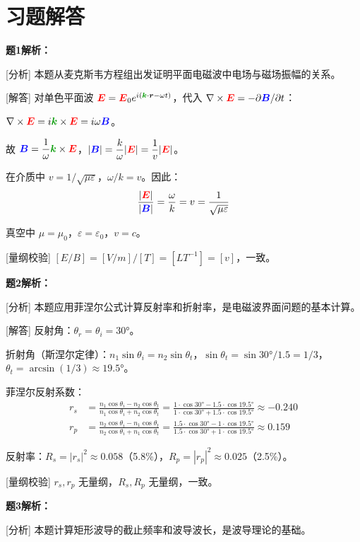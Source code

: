 \documentclass[11pt,a4paper,openany,oneside]{book}
\newcommand{\vecE}{\textcolor{red}{\vect{E}}}
\newcommand{\vecB}{\textcolor{blue}{\vect{B}}}
\newcommand{\vecK}{\textcolor{green!60!black}{\vect{k}}}
\newcommand{\eps}{\varepsilon}
\newcommand{\vect}[1]{\bm{#1}}
\newcommand{\curl}{\nabla\times}
\begin{document}
\section*{习题解答}

\textbf{题1解析：}

[分析] 本题从麦克斯韦方程组出发证明平面电磁波中电场与磁场振幅的关系。

[解答] 对单色平面波 $\vecE = \vecE_0 e^{i(\vecK\cdot\vect{r} - \omega t)}$，代入 $\curl\vecE = -\partial\vecB/\partial t$：

$\curl\vecE = i\vecK\times\vecE = i\omega\vecB$。

故 $\vecB = \dfrac{1}{\omega}\vecK\times\vecE$，$|\vecB| = \dfrac{k}{\omega}|\vecE| = \dfrac{1}{v}|\vecE|$。

在介质中 $v = 1/\sqrt{\mu\eps}$，$\omega/k = v$。因此：
\[
\frac{|\vecE|}{|\vecB|} = \frac{\omega}{k} = v = \frac{1}{\sqrt{\mu\eps}}
\]

真空中 $\mu = \mu_0$，$\eps = \eps_0$，$v = c$。\qedsymbol

[量纲校验] $[E/B] = [V/m]/[T] = [LT^{-1}] = [v]$，一致。\qedsymbol

\textbf{题2解析：}

[分析] 本题应用菲涅尔公式计算反射率和折射率，是电磁波界面问题的基本计算。

[解答] 反射角：$\theta_r = \theta_i = 30°$。

折射角（斯涅尔定律）：$n_1\sin\theta_i = n_2\sin\theta_t$，$\sin\theta_t = \sin 30°/1.5 = 1/3$，$\theta_t = \arcsin(1/3) \approx 19.5°$。

菲涅尔反射系数：
\begin{align*}
r_s &= \frac{n_1\cos\theta_i - n_2\cos\theta_t}{n_1\cos\theta_i + n_2\cos\theta_t} = \frac{1\cdot\cos 30° - 1.5\cdot\cos 19.5°}{1\cdot\cos 30° + 1.5\cdot\cos 19.5°} \approx -0.240 \\
r_p &= \frac{n_2\cos\theta_i - n_1\cos\theta_t}{n_2\cos\theta_i + n_1\cos\theta_t} = \frac{1.5\cdot\cos 30° - 1\cdot\cos 19.5°}{1.5\cdot\cos 30° + 1\cdot\cos 19.5°} \approx 0.159
\end{align*}

反射率：$R_s = |r_s|^2 \approx 0.058$（5.8\%），$R_p = |r_p|^2 \approx 0.025$（2.5\%）。\qedsymbol

[量纲校验] $r_s, r_p$ 无量纲，$R_s, R_p$ 无量纲，一致。\qedsymbol

\textbf{题3解析：}

[分析] 本题计算矩形波导的截止频率和波导波长，是波导理论的基础。
\end{document}
